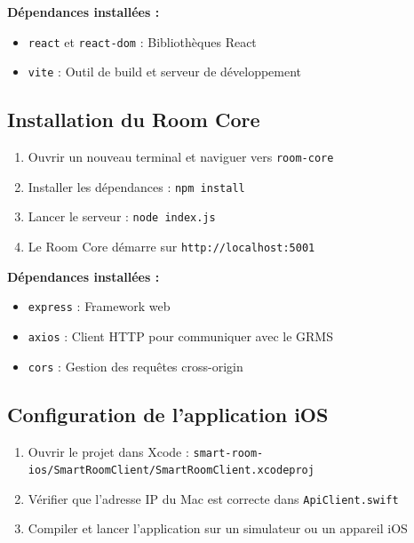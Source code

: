 \documentclass[11pt,a4paper]{article}
\begin{document}
\textbf{Dépendances installées :}
\begin{itemize}
    \item \texttt{react} et \texttt{react-dom} : Bibliothèques React
    \item \texttt{vite} : Outil de build et serveur de développement
\end{itemize}

\subsection{Installation du Room Core}

\begin{enumerate}
    \item Ouvrir un nouveau terminal et naviguer vers \texttt{room-core}
    \item Installer les dépendances : \texttt{npm install}
    \item Lancer le serveur : \texttt{node index.js}
    \item Le Room Core démarre sur \texttt{http://localhost:5001}
\end{enumerate}

\textbf{Dépendances installées :}
\begin{itemize}
    \item \texttt{express} : Framework web
    \item \texttt{axios} : Client HTTP pour communiquer avec le GRMS
    \item \texttt{cors} : Gestion des requêtes cross-origin
\end{itemize}

\subsection{Configuration de l'application iOS}

\begin{enumerate}
    \item Ouvrir le projet dans Xcode : \texttt{smart-room-ios/SmartRoomClient/SmartRoomClient.xcodeproj}
    \item Vérifier que l'adresse IP du Mac est correcte dans \texttt{ApiClient.swift}
    \item Compiler et lancer l'application sur un simulateur ou un appareil iOS
\end{enumerate}
\end{document}
